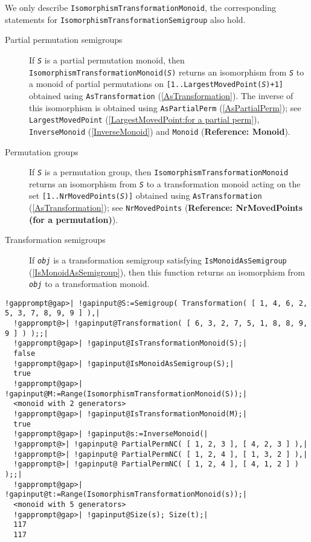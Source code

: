 \documentclass[a4paper,11pt]{report}
\begin{document}
{{{ We only describe \texttt{IsomorphismTransformationMonoid}, the corresponding statements for \texttt{IsomorphismTransformationSemigroup} also hold. 
\begin{description}
\item[{Partial permutation semigroups}]  If \mbox{\texttt{\mdseries\slshape S}} is a partial permutation monoid, then \texttt{IsomorphismTransformationMonoid(\mbox{\texttt{\mdseries\slshape S}})} returns an isomorphism from \mbox{\texttt{\mdseries\slshape S}} to a monoid of partial permutations on \texttt{[1..LargestMovedPoint(\mbox{\texttt{\mdseries\slshape S}})+1]} obtained using \texttt{AsTransformation} (\ref{AsTransformation}). The inverse of this isomorphism is obtained using \texttt{AsPartialPerm} (\ref{AsPartialPerm}); see \texttt{LargestMovedPoint} (\ref{LargestMovedPoint:for a partial perm}), \texttt{InverseMonoid} (\ref{InverseMonoid}) and \texttt{Monoid} (\textbf{Reference: Monoid}). 
\item[{Permutation groups}]  If \mbox{\texttt{\mdseries\slshape S}} is a permutation group, then \texttt{IsomorphismTransformationMonoid} returns an isomorphism from \mbox{\texttt{\mdseries\slshape S}} to a transformation monoid acting on the set \texttt{[1..NrMovedPoints(\mbox{\texttt{\mdseries\slshape S}})]} obtained using \texttt{AsTransformation} (\ref{AsTransformation}); see \texttt{NrMovedPoints} (\textbf{Reference: NrMovedPoints (for a permutation)}). 
\item[{Transformation semigroups}]  If \mbox{\texttt{\mdseries\slshape obj}} is a transformation semigroup satisfying \texttt{IsMonoidAsSemigroup} (\ref{IsMonoidAsSemigroup}), then this function returns an isomorphism from \mbox{\texttt{\mdseries\slshape obj}} to a transformation monoid. 

 
\end{description}
 
\begin{Verbatim}[commandchars=!@|,fontsize=\small,frame=single,label=Example]
  !gapprompt@gap>| !gapinput@S:=Semigroup( Transformation( [ 1, 4, 6, 2, 5, 3, 7, 8, 9, 9 ] ),|
  !gapprompt@>| !gapinput@Transformation( [ 6, 3, 2, 7, 5, 1, 8, 8, 9, 9 ] ) );;|
  !gapprompt@gap>| !gapinput@IsTransformationMonoid(S);|
  false
  !gapprompt@gap>| !gapinput@IsMonoidAsSemigroup(S);|
  true
  !gapprompt@gap>| !gapinput@M:=Range(IsomorphismTransformationMonoid(S));|
  <monoid with 2 generators>
  !gapprompt@gap>| !gapinput@IsTransformationMonoid(M);|
  true
  !gapprompt@gap>| !gapinput@s:=InverseMonoid(|
  !gapprompt@>| !gapinput@ PartialPermNC( [ 1, 2, 3 ], [ 4, 2, 3 ] ),|
  !gapprompt@>| !gapinput@ PartialPermNC( [ 1, 2, 4 ], [ 1, 3, 2 ] ),|
  !gapprompt@>| !gapinput@ PartialPermNC( [ 1, 2, 4 ], [ 4, 1, 2 ] ) );;|
  !gapprompt@gap>| !gapinput@t:=Range(IsomorphismTransformationMonoid(s));|
  <monoid with 5 generators>
  !gapprompt@gap>| !gapinput@Size(s); Size(t);|
  117
  117
\end{Verbatim}
 }

 }

 }
\end{document}
